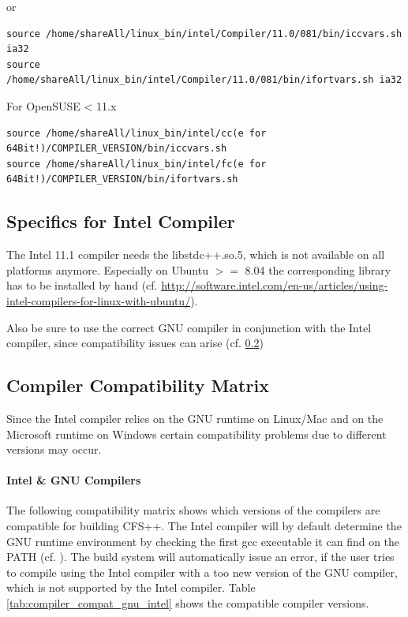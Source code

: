 or

\begin{verbatim}
source /home/shareAll/linux_bin/intel/Compiler/11.0/081/bin/iccvars.sh ia32
source /home/shareAll/linux_bin/intel/Compiler/11.0/081/bin/ifortvars.sh ia32
\end{verbatim}

For OpenSUSE < 11.x

\begin{verbatim}
source /home/shareAll/linux_bin/intel/cc(e for 64Bit!)/COMPILER_VERSION/bin/iccvars.sh
source /home/shareAll/linux_bin/intel/fc(e for 64Bit!)/COMPILER_VERSION/bin/ifortvars.sh
\end{verbatim}



\subsection{Specifics for Intel Compiler}

The Intel 11.1 compiler needs the libstdc++.so.5, which is not available on all
platforms anymore. Especially on Ubuntu $>=$ 8.04 the corresponding library has
to be installed by hand (cf.
\url{http://software.intel.com/en-us/articles/using-intel-compilers-for-linux-with-ubuntu/}).

Also be sure to use the correct GNU compiler in conjunction with the Intel
compiler, since compatibility issues can arise (cf.
\ref{sec:compiler_compat_matrix})

\subsection{Compiler Compatibility Matrix}
\label{sec:compiler_compat_matrix}

Since the  Intel compiler relies  on the GNU  runtime on Linux/Mac and  on the
Microsoft runtime  on Windows certain compatibility problems  due to different
versions may occur. 

\paragraph{Intel \&  GNU Compilers}  The following compatibility  matrix shows
which versions of  the compilers are compatible for  building CFS++. The Intel
compiler will by default determine the GNU runtime environment by checking the
first  gcc executable  it can  find  on the  PATH (cf.   \cite{IntelGNUCompat,
IntelWhitePapers}).  The  build system will  automatically issue an  error, if
the user tries to  compile using the Intel compiler with a  too new version of
the  GNU  compiler, which  is  not supported  by  the  Intel compiler.   Table
\ref{tab:compiler_compat_gnu_intel} shows the compatible compiler versions.



